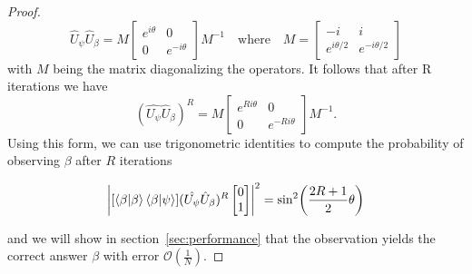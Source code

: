 \begin{proof}
\begin{equation*}
    \hat{U}_\psi\hat{U}_\beta = M  \begin{bmatrix}
    e^{i\theta} & 0 \\
    0 & e^{-i\theta}
    \end{bmatrix}  M^{-1} \quad \text{where} \quad M = \begin{bmatrix}
    -i & i \\
    e^{i\theta/2} & e^{-i\theta/2}
    \end{bmatrix}
  \end{equation*}
 with $M$ being the matrix diagonalizing the operators. It follows that after R iterations we have
\begin{equation*}
    (\hat{U_\psi}\hat{U}_\beta)^R = M  \begin{bmatrix}
    e^{Ri\theta} & 0 \\
    0 & e^{-Ri\theta}
    \end{bmatrix}  M^{-1}.
\end{equation*}
Using this form, we can use trigonometric identities to compute the probability of observing $\beta$ after $R$ iterations

\begin{equation*}
   \abs*{ [\braket{\beta | \beta} \braket{\beta | \psi}]
     (\hat{U_\psi}\hat{U}_\beta)^R \begin{bmatrix}
     0 \\ 1
     \end{bmatrix} }^2= \sin^2\biggl(\frac{2R+1}{2}\theta\biggr)
\end{equation*}

and we will show in section~\ref{sec:performance} that the observation yields the correct answer $\beta$ with error $\mathcal{O}(\frac{1}{N})$.
\end{proof}